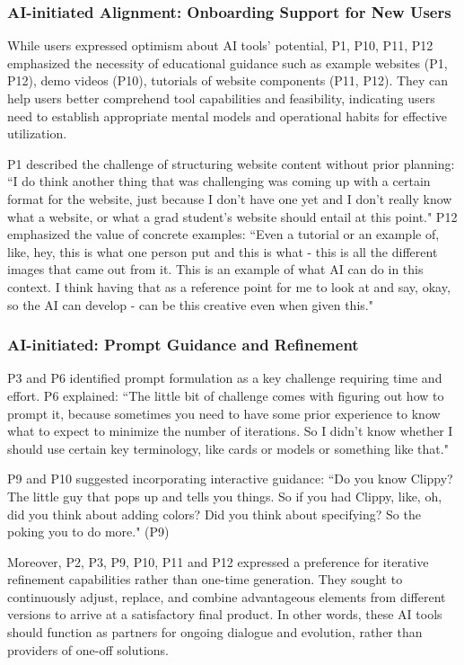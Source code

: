 \subsubsection{AI-initiated Alignment: Onboarding Support for New Users}
While users expressed optimism about AI tools' potential, P1, P10, P11, P12 emphasized the necessity of educational guidance such as example websites (P1, P12), demo videos (P10), tutorials of website components (P11, P12). They can help users better comprehend tool capabilities and feasibility, indicating users need to establish appropriate mental models and operational habits for effective utilization.

P1 described the challenge of structuring website content without prior planning: ``I do think another thing that was challenging was coming up with a certain format for the website, just because I don't have one yet and I don't really know what a website, or what a grad student's website should entail at this point." P12 emphasized the value of concrete examples: ``Even a tutorial or an example of, like, hey, this is what one person put and this is what - this is all the different images that came out from it. This is an example of what AI can do in this context. I think having that as a reference point for me to look at and say, okay, so the AI can develop - can be this creative even when given this."

\subsubsection{ AI-initiated: Prompt Guidance and Refinement}
P3 and P6 identified prompt formulation as a key challenge requiring time and effort. P6 explained: ``The little bit of challenge comes with figuring out how to prompt it, because sometimes you need to have some prior experience to know what to expect to minimize the number of iterations. So I didn't know whether I should use certain key terminology, like cards or models or something like that."

P9 and P10 suggested incorporating interactive guidance: ``Do you know Clippy? The little guy that pops up and tells you things. So if you had Clippy, like, oh, did you think about adding colors? Did you think about specifying? So the poking you to do more." (P9)

Moreover, P2, P3, P9, P10, P11 and P12 expressed a preference for iterative refinement capabilities rather than one-time generation. They sought to continuously adjust, replace, and combine advantageous elements from different versions to arrive at a satisfactory final product. In other words, these AI tools should function as partners for ongoing dialogue and evolution, rather than providers of one-off solutions.

